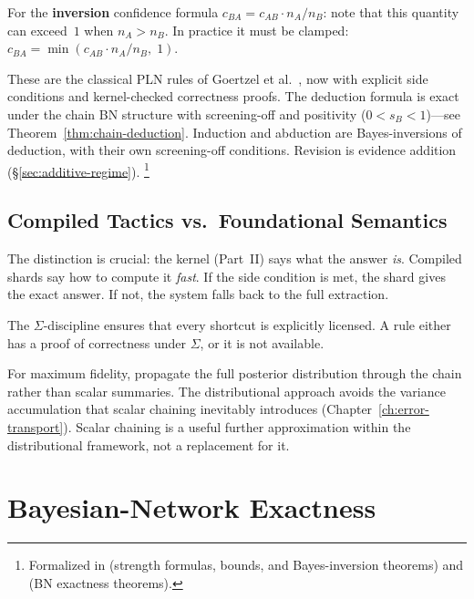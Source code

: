 \documentclass[11pt,openany]{report}
\begin{document}
\smallskip\noindent
For the \textbf{inversion} confidence formula
$c_{BA} = c_{AB} \cdot n_A / n_B$: note that this quantity can
exceed~$1$ when $n_A > n_B$.  In practice it must be clamped:
$c_{BA} = \min(c_{AB} \cdot n_A / n_B,\; 1)$.

\medskip

\noindent
These are the classical PLN rules of Goertzel et
al.~\cite{goertzel2009pln}, now with explicit side conditions and
kernel-checked correctness proofs.  The deduction formula is exact
under the chain BN structure with screening-off and positivity
($0 < s_B < 1$)---see Theorem~\ref{thm:chain-deduction}.
Induction and abduction are
Bayes-inversions of deduction, with their own screening-off
conditions.  Revision is evidence addition
(\S\ref{sec:additive-regime}).%
\footnote{Formalized in 
(strength formulas, bounds, and Bayes-inversion theorems) and
 (BN exactness
theorems).}

\section{Compiled Tactics vs.\ Foundational Semantics}

The distinction is crucial: the kernel (Part~II) says what the answer
\emph{is}.  Compiled shards say how to compute it \emph{fast}.  If
the side condition is met, the shard gives the exact answer.  If not,
the system falls back to the full extraction.

The $\Sigma$-discipline ensures that every shortcut is explicitly
licensed.  A rule either has a proof of correctness under $\Sigma$,
or it is not available.

For maximum fidelity, propagate the full posterior distribution
through the chain rather than scalar summaries.  The distributional
approach avoids the variance accumulation that scalar chaining
inevitably introduces (Chapter~\ref{ch:error-transport}).  Scalar
chaining is a useful further approximation within the distributional
framework, not a replacement for it.


\chapter{Bayesian-Network Exactness}
\label{ch:bn-models}
\end{document}
